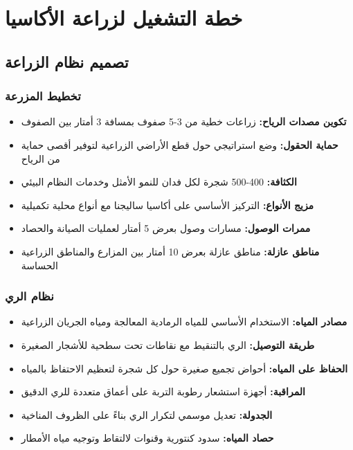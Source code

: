 \section{خطة التشغيل لزراعة الأكاسيا}

\subsection{تصميم نظام الزراعة}

\subsubsection{تخطيط المزرعة}
\begin{itemize}
    \item \textbf{تكوين مصدات الرياح:} زراعات خطية من 3-5 صفوف بمسافة 3 أمتار بين الصفوف
    \item \textbf{حماية الحقول:} وضع استراتيجي حول قطع الأراضي الزراعية لتوفير أقصى حماية من الرياح
    \item \textbf{الكثافة:} 400-500 شجرة لكل فدان للنمو الأمثل وخدمات النظام البيئي
    \item \textbf{مزيج الأنواع:} التركيز الأساسي على أكاسيا ساليجنا مع أنواع محلية تكميلية
    \item \textbf{ممرات الوصول:} مسارات وصول بعرض 5 أمتار لعمليات الصيانة والحصاد
    \item \textbf{مناطق عازلة:} مناطق عازلة بعرض 10 أمتار بين المزارع والمناطق الزراعية الحساسة
\end{itemize}

\subsubsection{نظام الري}
\begin{itemize}
    \item \textbf{مصادر المياه:} الاستخدام الأساسي للمياه الرمادية المعالجة ومياه الجريان الزراعية
    \item \textbf{طريقة التوصيل:} الري بالتنقيط مع نقاطات تحت سطحية للأشجار الصغيرة
    \item \textbf{الحفاظ على المياه:} أحواض تجميع صغيرة حول كل شجرة لتعظيم الاحتفاظ بالمياه
    \item \textbf{المراقبة:} أجهزة استشعار رطوبة التربة على أعماق متعددة للري الدقيق
    \item \textbf{الجدولة:} تعديل موسمي لتكرار الري بناءً على الظروف المناخية
    \item \textbf{حصاد المياه:} سدود كنتورية وقنوات لالتقاط وتوجيه مياه الأمطار
\end{itemize}


